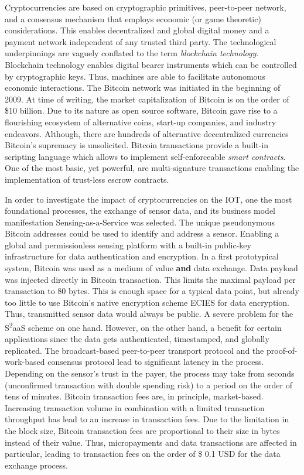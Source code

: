 Cryptocurrencies are based on cryptographic primitives, peer-to-peer network, and a consensus mechanism that employs economic (or game theoretic) considerations. This enables decentralized and global digital money and a payment network independent of any trusted third party. The technological underpinnings are vaguely conflated to the term \emph{blockchain technology}. Blockchain technology enables digital bearer instruments which can be controlled by cryptographic keys. Thus, machines are able to facilitate autonomous economic interactions. 
The Bitcoin network was initiated in the beginning of 2009. At time of writing, the market capitalization of Bitcoin is on the order of \$10 billion. Due to its nature as open source software, Bitcoin gave rise to a flourishing ecosystem of alternative coins, start-up companies, and industry endeavors. Although, there are hundreds of alternative decentralized currencies Bitcoin's supremacy is unsolicited. Bitcoin transactions provide a built-in scripting language which allows to implement self-enforceable \emph{smart contracts}. One of the most basic, yet powerful, are multi-signature transactions enabling the implementation of trust-less escrow contracts.

In order to investigate the impact of cryptocurrencies on the \ac{IOT}, one the most foundational processes, the exchange of sensor data, and its business model manifestation Sensing-as-a-Service was selected. The unique pseudonymous Bitcoin addresses could be used to identify and address a sensor. Enabling a global and permissionless sensing platform with a built-in public-key infrastructure for data authentication and encryption. In a first prototypical system, Bitcoin was used as a medium of value \textbf{and} data exchange. Data payload was injected directly in Bitcoin transaction. This limits the maximal payload per transaction to 80 bytes. This is enough space for a typical data point, but already too little to use Bitcoin's native encryption scheme \ac{ECIES} for data encryption. Thus, transmitted sensor data would always be public. A severe problem for the S\textsuperscript{2}aaS scheme on one hand. However, on the other hand, a benefit for certain applications since the data gets authenticated, timestamped, and globally replicated. The broadcast-based peer-to-peer transport protocol and the proof-of-work-based consensus protocol lead to significant latency in the process. Depending on the sensor's trust in the payer, the process may take from seconds (unconfirmed transaction with double spending risk) to a period on the order of tens of minutes. Bitcoin transaction fees are, in principle, market-based. Increasing transaction volume in combination with a limited transaction throughput has lead to an increase in transaction fees. Due to the limitation in the block size, Bitcoin transaction fees are proportional to their size in bytes instead of their value. Thus, micropayments and data transactions are affected in particular, leading to transaction fees on the order of \$ 0.1 USD for the data exchange process. 

